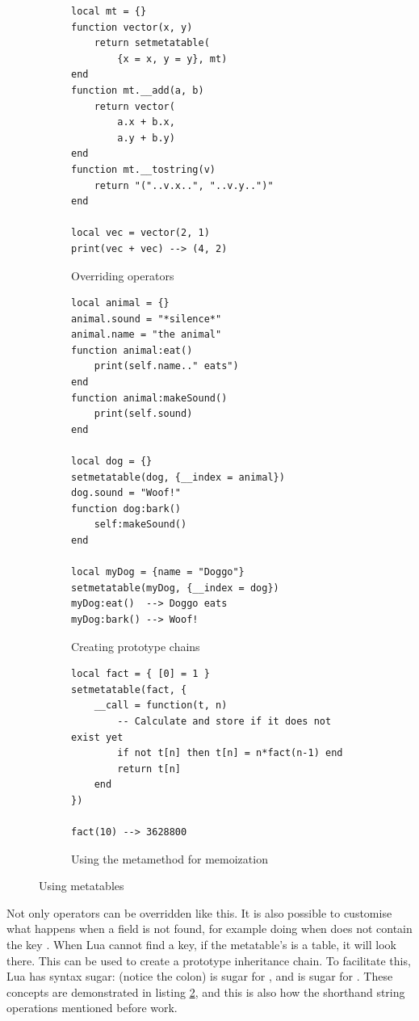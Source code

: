\begin{figure}[ht]
\centering
\begin{subfigure}{0.49\textwidth}
\begin{verbatim}
local mt = {}
function vector(x, y)
    return setmetatable(
        {x = x, y = y}, mt)
end
function mt.__add(a, b)
    return vector(
        a.x + b.x,
        a.y + b.y)
end
function mt.__tostring(v)
    return "("..v.x..", "..v.y..")"
end

local vec = vector(2, 1)
print(vec + vec) --> (4, 2)
\end{verbatim}
\caption{Overriding operators}
\label{lst:lua_metatables_operators}
\end{subfigure}
\begin{subfigure}{0.49\textwidth}
\begin{verbatim}
local animal = {}
animal.sound = "*silence*"
animal.name = "the animal"
function animal:eat()
    print(self.name.." eats")
end
function animal:makeSound()
    print(self.sound)
end

local dog = {}
setmetatable(dog, {__index = animal})
dog.sound = "Woof!"
function dog:bark()
    self:makeSound()
end

local myDog = {name = "Doggo"}
setmetatable(myDog, {__index = dog})
myDog:eat()  --> Doggo eats
myDog:bark() --> Woof!
\end{verbatim}
\caption{Creating prototype chains}
\label{lst:lua_metatables_prototypes}
\end{subfigure}
\begin{subfigure}{0.9\textwidth}
\begin{verbatim}
local fact = { [0] = 1 }
setmetatable(fact, {
    __call = function(t, n)
        -- Calculate and store if it does not exist yet
        if not t[n] then t[n] = n*fact(n-1) end
        return t[n]
    end
})

fact(10) --> 3628800
\end{verbatim}
\caption{Using the  metamethod for memoization\footnotemark}
\label{lst:lua_metatables_fact}
\end{subfigure}
\caption{Using metatables}
\label{lst:lua_metatables}
\end{figure}

Not only operators can be overridden like this. It is also possible to customise what happens when a field is not found, for example doing  when  does not contain the key . When Lua cannot find a key, if the metatable's  is a table, it will look there. This can be used to create a prototype inheritance chain. To facilitate this, Lua has syntax sugar:  (notice the colon) is sugar for , and  is sugar for . These concepts are demonstrated in listing \ref{lst:lua_metatables_prototypes}, and this is also how the shorthand string operations mentioned before work.

